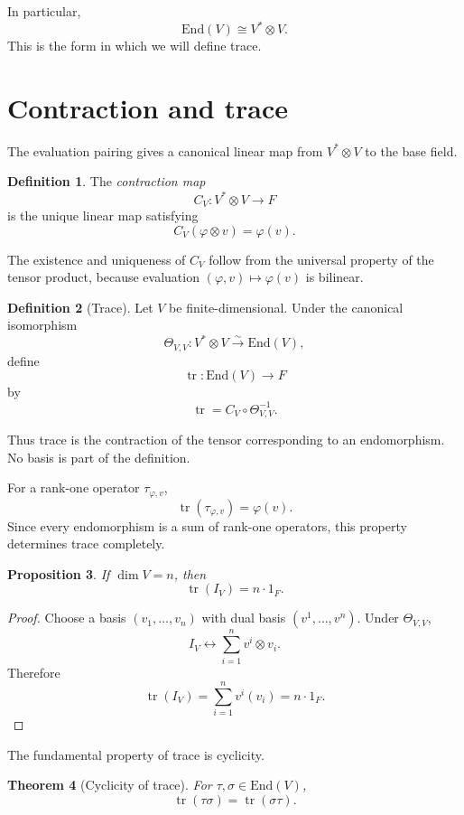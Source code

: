 \documentclass{amsbook}
\newtheorem{theorem}{Theorem}[chapter]
\newtheorem{proposition}[theorem]{Proposition}
\theoremstyle{definition}
\newtheorem{definition}[theorem]{Definition}
\theoremstyle{remark}
\newcommand{\End}{\mathrm{End}}
\newcommand{\tr}{\operatorname{tr}}
\numberwithin{section}{chapter}
\numberwithin{equation}{chapter}
\begin{document}
In particular,
\[
\End(V)\cong V^*\otimes V.
\]
This is the form in which we will define trace.

\section{Contraction and trace}

The evaluation pairing gives a canonical linear map from $V^*\otimes V$ to the base field.

\begin{definition}
The \emph{contraction map}
\[
C_V\colon V^*\otimes V\longrightarrow F
\]
is the unique linear map satisfying
\[
C_V(\varphi\otimes v)=\varphi(v).
\]
\end{definition}

The existence and uniqueness of $C_V$ follow from the universal property of the tensor product, because evaluation $(\varphi,v)\mapsto\varphi(v)$ is bilinear.

\begin{definition}[Trace]\label{def:trace}
Let $V$ be finite-dimensional. Under the canonical isomorphism
\[
\Theta_{V,V}\colon V^*\otimes V\xrightarrow{\sim}\End(V),
\]
define
\[
\tr\colon\End(V)\longrightarrow F
\]
by
\[
\boxed{\tr=C_V\circ\Theta_{V,V}^{-1}.}
\]
\end{definition}

Thus trace is the contraction of the tensor corresponding to an endomorphism. No basis is part of the definition.

For a rank-one operator $\tau_{\varphi,v}$,
\[
\tr(\tau_{\varphi,v})=\varphi(v).
\]
Since every endomorphism is a sum of rank-one operators, this property determines trace completely.

\begin{proposition}\label{prop:trace-identity}
If $\dim V=n$, then
\[
\tr(I_V)=n\cdot1_F.
\]
\end{proposition}

\begin{proof}
Choose a basis $(v_1,\dots,v_n)$ with dual basis $(v^1,\dots,v^n)$. Under $\Theta_{V,V}$,
\[
I_V
\longleftrightarrow
\sum_{i=1}^n v^i\otimes v_i.
\]
Therefore
\[
\tr(I_V)
=
\sum_{i=1}^n v^i(v_i)
=
n\cdot1_F.
\]
\end{proof}

The fundamental property of trace is cyclicity.

\begin{theorem}[Cyclicity of trace]\label{thm:trace-cyclic}
For $\tau,\sigma\in\End(V)$,
\[
\tr(\tau\sigma)=\tr(\sigma\tau).
\]
\end{theorem}
\end{document}
